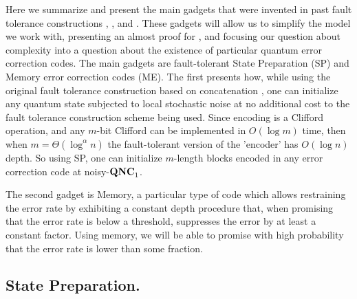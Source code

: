 \documentclass[manuscript,screen,review]{acmart}
\begin{document}
{Here we summarize and present the main gadgets that were invented in past fault tolerance constructions \cite{aharonov1999faulttolerant}, \cite{gottesman2014faulttolerant}, and \cite{grospellier:tel-03364419}. These gadgets will allow us to simplify the model we work with, presenting an almost proof for \CDO, and focusing our question about complexity into a question about the existence of particular quantum error correction codes. The main gadgets are fault-tolerant State Preparation (SP) and Memory error correction codes (ME). The first presents how, while using the original fault tolerance construction based on concatenation \cite{aharonov1999faulttolerant}, one can initialize any quantum state subjected to local stochastic noise at no additional cost to the fault tolerance construction scheme being used. Since encoding is a Clifford operation, and any $m$-bit Clifford can be implemented in $O(\log m)$ time, then when $m =\Theta(\log^{\alpha} n)$ the fault-tolerant version of the 'encoder' has $O(\log n)$ depth. So using SP, one can initialize $m$-length blocks encoded in any error correction code at noisy-$\mathbf{QNC}_{1}{}$.

The second gadget is Memory, a particular type of code which allows restraining the error rate by exhibiting a constant depth procedure that, when promising that the error rate is below a threshold, suppresses the error by at least a constant factor. Using memory, we will be able to promise with high probability that the error rate is lower than some fraction. 

\subsection{State Preparation.}


}
\end{document}
